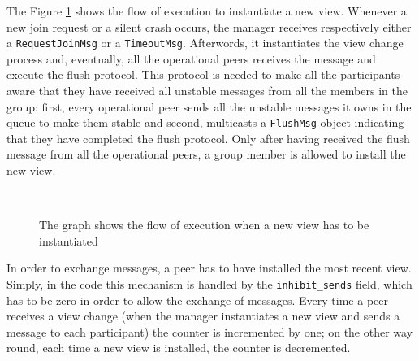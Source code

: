 \documentclass[conference]{IEEEtran}
\begin{document}
The Figure \ref{fig:NewView} shows the flow of execution to instantiate a new view.
Whenever a new join request or a silent crash occurs, the manager receives respectively either a \texttt{RequestJoinMsg} or a \texttt{TimeoutMsg}. 
Afterwords, it instantiates the view change process and, eventually, all the operational peers receives the message and execute the flush protocol. 
This protocol is needed to make all the participants aware that they have received all unstable messages from all the members in the group: 
first, every operational peer sends all the unstable messages it owns in the queue to make them stable and second, 
multicasts a \texttt{FlushMsg} object indicating that they have completed the flush protocol. 
Only after having received the flush message from all the operational peers, a group member is allowed to install the new view.
\begin{figure}[ht]%
	\centering
	\\%
	\caption{The graph shows the flow of execution when a new view has
	to be instantiated}%
	\label{fig:NewView}%
\end{figure}
In order to exchange messages, a peer has to have installed the most recent view. 
Simply, in the code this mechanism is handled by the \texttt{inhibit\_sends} field, which has to be zero in order to allow the exchange of messages. 
Every time a peer receives a view change (when the manager instantiates a new view and sends a message to each participant) the counter is incremented 
by one; on the other way round, each time a new view is installed, the counter is decremented.
\end{document}
